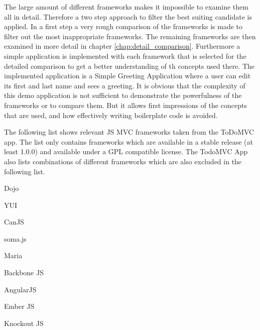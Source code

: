 The large amount of different frameworks makes it impossible to examine them all in detail.
Therefore a two step approach to filter the best suiting candidate is applied.
In a first step a very rough comparison of the frameworks is made to filter out the most inappropriate frameworks.
The remaining frameworks are then examined in more detail in chapter \ref{chap:detail_comparison}.
Furthermore a simple application is implemented with each framework that is selected for the detailed comparison to get a better understanding of th concepts used there.
The implemented application is a Simple Greeting Application where a user can edit its first and last name and sees a greeting. 
It is obvious that the complexity of this demo application is not sufficient to demonstrate the powerfulness of the frameworks or to compare them. But it allows first impressions of the concepts that are used, and how effectively writing boilerplate code is avoided.

   
The following list shows relevant JS MVC frameworks taken from the ToDoMVC app.
The list only contains frameworks which are available in a stable release (at least 1.0.0) and available under a GPL compatible license.
The TodoMVC App also lists combinations of different frameworks which are also excluded in the following list.\\

\begin{itemize}
\begin{minipage}{0.5\textwidth}

	\item Dojo
	\item YUI
	\item CanJS
	\item soma.js
	\item Maria
\end{minipage}
\begin{minipage}{0.5\textwidth}

	\item Backbone JS
	\item AngularJS
	\item Ember JS
	\item Knockout JS
	\end{minipage}
\end{itemize}


